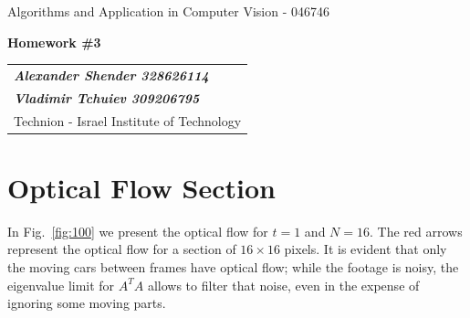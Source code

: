 \documentclass[a4paper]{iacas}
\begin{document}
\begin{center}
 \large Algorithms and Application in Computer Vision - 046746
 \end{center}
\begin{center}
\large\textbf{Homework \#3}
 \end{center}


\begin{tabular}{l}
\\
{\bf\textit{Alexander Shender 328626114}} \\
{\bf\textit{Vladimir Tchuiev 309206795}} \\
Technion - Israel Institute of Technology
\end{tabular}


\newpage
\vspace{2em}

\section{Optical Flow Section}

In Fig.~\ref{fig:100} we present the optical flow for $t=1$ and $N=16$. The red arrows represent the optical flow for a section of $16 \times 16$ pixels. It is evident that only the moving cars between frames have optical flow; while the footage is noisy, the eigenvalue limit for $A^T A$ allows to filter that noise, even in the expense of ignoring some moving parts.
\end{document}
